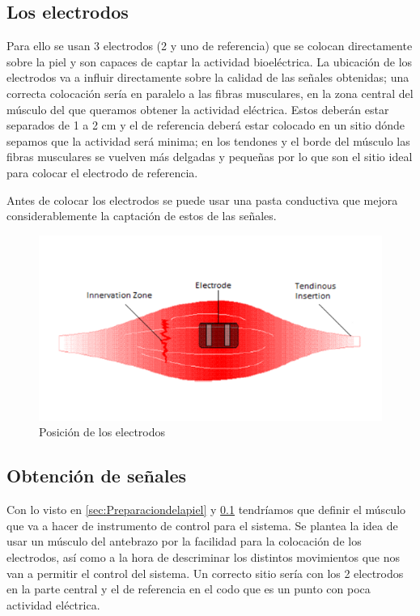 \subsection{Los electrodos} \label{sec:Loselectrodos}
Para ello se usan 3 electrodos  (2 y uno de referencia) que se colocan directamente sobre la piel y son capaces de captar la actividad bioeléctrica. La ubicación de los electrodos va a influir directamente sobre la calidad de las señales obtenidas; una correcta colocación sería en paralelo a las fibras musculares, en la zona central del músculo del que queramos obtener la actividad eléctrica. Estos deberán estar separados de 1 a 2 cm y el de referencia deberá estar colocado en un sitio dónde sepamos que la actividad será minima; en los tendones y el borde del músculo las fibras musculares se vuelven más delgadas y pequeñas por lo que son el sitio ideal para colocar el electrodo de referencia. 

Antes de colocar los electrodos se puede usar una pasta conductiva que mejora considerablemente la captación de estos de las señales.\newline

\begin{figure}[H]
	\center
	\includegraphics[scale=0.8]{imagenes/Disenodelsistema/electrodo.png}
	\caption{Posición de los electrodos}
	\label{fig:Posicion}
\end{figure}

\subsection{Obtención de señales}

Con lo visto en \ref{sec:Preparaciondelapiel} y \ref{sec:Loselectrodos} tendríamos que definir el músculo que va a hacer de instrumento de control para el sistema. Se plantea la idea de usar un músculo del antebrazo por la facilidad para la colocación de los electrodos, así como a la hora de descriminar los distintos movimientos que nos van a permitir el control del sistema. Un correcto sitio sería con los 2 electrodos en la parte central y el de referencia en el codo que es un punto con poca actividad eléctrica.\newline 

